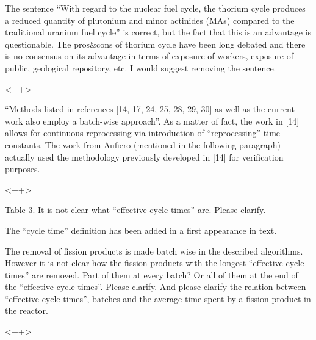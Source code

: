 \documentclass[answers,11pt]{exam}
\begin{document}
\begin{questions}
        \question The sentence ``With regard to the nuclear fuel cycle, the 
        thorium cycle produces a reduced quantity of plutonium and minor 
        actinides (MAs) compared to the traditional uranium fuel cycle'' is 
        correct, but the fact that this is an advantage is questionable. The 
        pros\&cons of thorium cycle have been long debated and there is no 
        consensus on its advantage in terms of exposure of workers, exposure of 
        public, geological repository, etc. I would suggest removing the 
        sentence.
        \begin{solution}
                <++>
        \end{solution}



        \question ``Methods listed in references [14, 17, 24, 25, 28, 29, 30] 
        as well as the current work also employ a batch-wise approach''. As a 
        matter of fact, the work in [14]  allows for continuous reprocessing 
        via introduction of ``reprocessing'' time constants. The work from  
        Aufiero (mentioned in the following paragraph) actually used the 
        methodology previously developed in [14]  for verification purposes.
        \begin{solution}
                <++>
        \end{solution}


        \question Table 3. It is not clear what ``effective cycle times'' are. 
        Please clarify.
        \begin{solution}
                The ``cycle time'' definition has been added in a first appearance in text.
        \end{solution}


        \question The removal of fission products is made batch wise in the 
        described algorithms. However it is not clear how the fission products 
        with the longest ``effective cycle times'' are removed. Part of them at 
        every batch? Or all of them at the end of the  ``effective cycle 
        times''.  Please clarify. And please clarify the relation between 
        ``effective cycle times'', batches and the average time spent by a 
        fission product in the reactor.
        \begin{solution}
                <++>
        \end{solution}


\end{questions}
\end{document}
